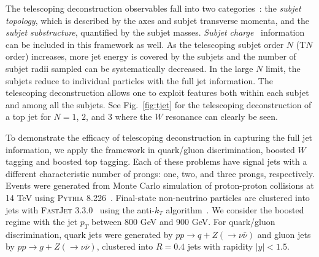 \documentclass[notoc]{JHEP3}
\DeclareRobustCommand{\Fig}[1]{Fig.~\ref{#1}}
\begin{document}
The telescoping deconstruction observables fall into two categories~\cite{Chien:2017xrb}: the {\sl subjet topology}, which is described by the axes and subjet transverse momenta, and the {\sl subjet substructure}, quantified by the subjet masses. {\sl Subjet charge}~\cite{Krohn:2012fg} information can be included in this framework as well. As the telescoping subjet order $N$ (T$N$ order) increases, more jet energy is covered by the subjets and the number of subjet radii sampled can be systematically decreased. In the large $N$ limit, the subjets reduce to individual particles with the full jet information. The telescoping deconstruction allows one to exploit features both within each subjet and among all the subjets. See \Fig{fig:tjet} for the telescoping deconstruction of a top jet for $N = 1$, $2$, and $3$ where the $W$ resonance can clearly be seen.

To demonstrate the efficacy of telescoping deconstruction in capturing the full jet information,
we apply the framework in quark/gluon discrimination, boosted $W$ tagging and boosted top tagging. Each of these problems have
signal jets with a different characteristic number of prongs: one, two, and three prongs, respectively. Events were generated from Monte Carlo simulation of proton-proton collisions at 14 TeV using \textsc{Pythia} 8.226~\cite{Sjostrand:2007gs}. Final-state non-neutrino particles are clustered into jets with \textsc{FastJet} 3.3.0~\cite{Cacciari:2011ma} using the anti-$k_T$ algorithm~\cite{Cacciari:2008gp}. We consider the boosted regime with the jet $p_T$ between 800 GeV and 900 GeV. For quark/gluon discrimination, quark jets were generated by $pp\to q+Z(\to\nu\bar\nu)$ and gluon jets %
by $pp\to g + Z(\to\nu\bar\nu)$, clustered into $R=0.4$ jets with rapidity $|y|<1.5$.
\end{document}
